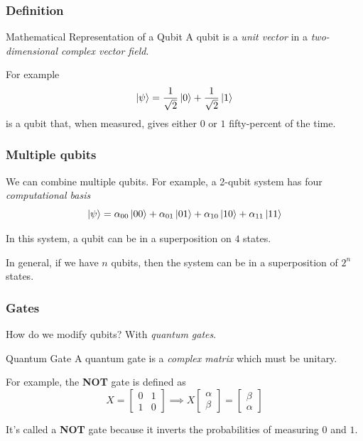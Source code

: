 \documentclass{beamer}
\begin{document}
  \begin{frame}
    \frametitle{Definition}
    \begin{block}{Mathematical Representation of a Qubit}
      A qubit is a \textit{unit vector} in a \textit{two-dimensional complex vector field}.
    \end{block}

    For example
    \begin{equation*}
      \ket\psi = \frac1{\sqrt 2}\ket0 + \frac1{\sqrt 2}\ket1
    \end{equation*}
    is a qubit that, when measured, gives either $0$ or $1$ fifty-percent of the time.
  \end{frame}
  \begin{frame}
    \frametitle{Multiple qubits}
    We can combine multiple qubits. For example, a 2-qubit system has four \textit{computational basis}
    \begin{equation*}
      \ket\psi = \alpha_{00}\ket{00} + \alpha_{01}\ket{01} + \alpha_{10}\ket{10} + \alpha_{11}\ket{11}
    \end{equation*}

    In this system, a qubit can be in a superposition on $4$ states.

    In general, if we have $n$ qubits, then the system can be in a superposition of $2^n$ states.
  \end{frame}
  \begin{frame}
    \frametitle{Gates}
    How do we modify qubits? With \textit{quantum gates}.
    \begin{block}{Quantum Gate}
      A quantum gate is a \textit{complex matrix} which must be unitary.
    \end{block}

    For example, the \textbf{NOT} gate is defined as
    \begin{equation*}
      X = \begin{bmatrix}
        0 & 1 \\ 1 & 0
      \end{bmatrix}
      \implies
      X\begin{bmatrix}
        \alpha \\ \beta
      \end{bmatrix}
      = \begin{bmatrix}
        \beta \\ \alpha
      \end{bmatrix}
    \end{equation*}

    It's called a \textbf{NOT} gate because it inverts the probabilities of measuring $0$ and $1$.
  \end{frame}
\end{document}
